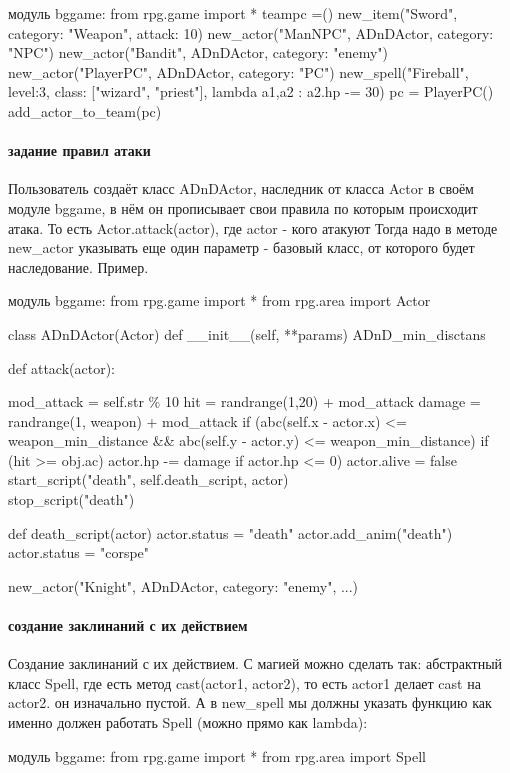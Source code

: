 модуль bggame:
from rpg.game import *
teampc =()
new\_item("Sword", category: "Weapon", attack: 10)
new\_actor("ManNPC", ADnDActor, category: "NPC")
new\_actor("Bandit",  ADnDActor, category: "enemy")
new\_actor("PlayerPC", ADnDActor, category: "PC")
new\_spell("Fireball", level:3, class: ["wizard", "priest"], lambda a1,a2 : a2.hp -= 30)
pc = PlayerPC()
add\_actor\_to\_team(pc)

\paragraph{задание правил атаки}
Пользователь создаёт класс ADnDActor, наследник от класса Actor в своём модуле bggame, в нём он прописывает свои правила по которым происходит атака. То есть Actor.attack(actor), где actor - кого атакуют
Тогда надо в методе new\_actor указывать еще один параметр - базовый класс, от которого будет наследование.
Пример.

модуль bggame:
from rpg.game import *
from rpg.area import Actor	

class ADnDActor(Actor)
def \_\_init\_\_(self, **params)
ADnD\_min\_disctans

def attack(actor):

	mod\_attack = self.str \% 10
	hit = randrange(1,20) + mod\_attack
	damage = randrange(1, weapon) + mod\_attack
	if (abc(self.x - actor.x) <= weapon\_min\_distance \&\& abc(self.y - actor.y) <= weapon\_min\_distance)
		if (hit >= obj.ac)
		actor.hp -= damage
		if actor.hp <= 0)
			actor.alive = false
			start\_script("death", self.death\_script, actor)\\
			stop\_script("death")

def death\_script(actor)
	actor.status = "death" %
	actor.add\_anim("death")
	actor.status = "corspe" %

new\_actor("Knight", ADnDActor, category: "enemy", ...)

\paragraph{создание заклинаний с их действием}
Создание заклинаний с их действием. С магией можно сделать так: абстрактный класс Spell, где есть метод cast(actor1, actor2), то есть actor1 делает cast на actor2. он изначально пустой. А в new\_spell мы должны указать функцию как именно должен работать Spell (можно прямо как lambda):

модуль bggame:
from rpg.game import *
from rpg.area import Spell

